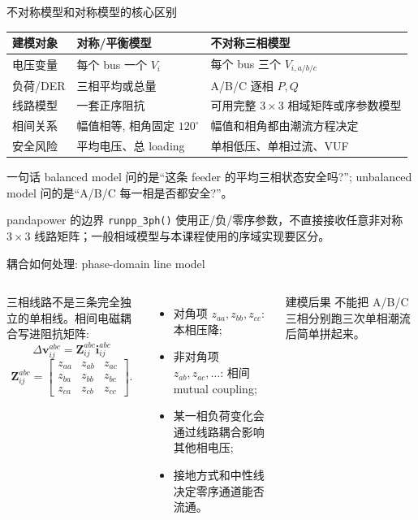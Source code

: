 \documentclass[aspectratio=169,10pt]{ctexbeamer}
\newcommand{\code}[1]{\texttt{#1}}
\begin{document}
\begin{frame}{不对称模型和对称模型的核心区别}
\small
\begin{tabular}{p{}p{}p{}}
\toprule
建模对象 & 对称/平衡模型 & 不对称三相模型 \\
\midrule
电压变量 & 每个 bus 一个 $V_i$ & 每个 bus 三个 $V_{i,a/b/c}$ \\
负荷/DER & 三相平均或总量 & A/B/C 逐相 $P,Q$ \\
线路模型 & 一套正序阻抗 & 可用完整 $3\times3$ 相域矩阵或序参数模型 \\
相间关系 & 幅值相等, 相角固定 $120^\circ$ & 幅值和相角都由潮流方程决定 \\
安全风险 & 平均电压、总 loading & 单相低压、单相过流、VUF \\
\bottomrule
\end{tabular}
\vspace{0.8em}
\begin{block}{一句话}
balanced model 问的是“这条 feeder 的平均三相状态安全吗?”; unbalanced model 问的是“A/B/C 每一相是否都安全?”。
\end{block}
\begin{alertblock}{pandapower 的边界}
\code{runpp\_3ph()} 使用正/负/零序参数，不直接接收任意非对称 $3\times3$ 线路矩阵；一般相域模型与本课程使用的序域实现要区分。
\end{alertblock}
\end{frame}

\begin{frame}{耦合如何处理: phase-domain line model}
\begin{columns}[T]
\small
三相线路不是三条完全独立的单相线。相间电磁耦合写进阻抗矩阵:
\[
\Delta\mathbf{v}_{ij}^{abc}
=
\mathbf{Z}_{ij}^{abc}\mathbf{i}_{ij}^{abc}
\]
\[
\mathbf{Z}_{ij}^{abc}=
\begin{bmatrix}
z_{aa} & z_{ab} & z_{ac}\\
z_{ba} & z_{bb} & z_{bc}\\
z_{ca} & z_{cb} & z_{cc}
\end{bmatrix}.
\]
\small
\begin{itemize}
  \item 对角项 $z_{aa},z_{bb},z_{cc}$: 本相压降;
  \item 非对角项 $z_{ab},z_{ac},\ldots$: 相间 mutual coupling;
  \item 某一相负荷变化会通过线路耦合影响其他相电压;
  \item 接地方式和中性线决定零序通道能否流通。
\end{itemize}
\begin{alertblock}{建模后果}
不能把 A/B/C 三相分别跑三次单相潮流后简单拼起来。
\end{alertblock}
\end{columns}
\end{frame}
\end{document}
